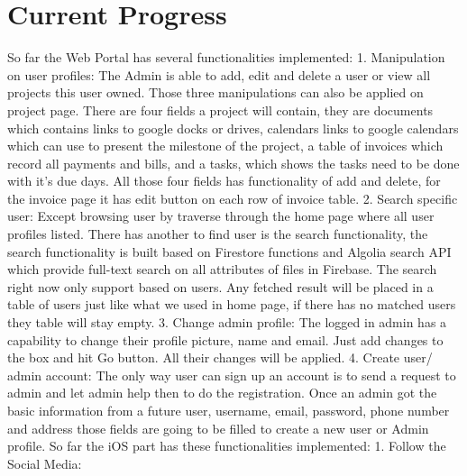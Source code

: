 \documentclass{article}
\newcommand\tab[1][0.5cm]{\hspace*{#1}}
\begin{document}
\section{Current Progress}
So far the Web Portal has several functionalities implemented:\newline
\tab 1. Manipulation on user profiles:\newline
\tab The Admin is able to add, edit and delete a user or view all projects this user owned. Those three manipulations can also be applied on project page. There are four fields a project will contain, they are documents which contains links to google docks or drives, calendars links to google calendars which can use to present the milestone of the project, a table of invoices which record all payments and bills, and a tasks, which shows the tasks need to be done with it's due days. All those four fields has functionality of add and delete, for the invoice page it has edit button on each row of invoice table.\newline
\tab 2. Search specific user:\newline
\tab Except browsing user by traverse through the home page where all user profiles listed. There has another to find user is the search functionality, the search functionality is built based on Firestore functions and Algolia search API which provide full-text search on all attributes of files in Firebase. The search right now only support based on users. Any fetched result will be placed in a table of users just like what we used in home page, if there has no matched users they table will stay empty.\newline
\tab 3. Change admin profile:\newline
The logged in admin has a capability to change their profile picture, name and email. Just add changes to the box and hit Go button. All their changes will be applied.\newline
\tab 4. Create user/ admin account:\newline
\tab The only way user can sign up an account is to send a request to admin and let admin help then to do the registration. Once an admin got the basic information from a future user, username, email, password, phone number and address those fields are going to be filled to create a new user or Admin profile.\newline
\newline
\tab So far the iOS part has these functionalities implemented:\newline
\tab 1. Follow the Social Media:\newline
\end{document}
